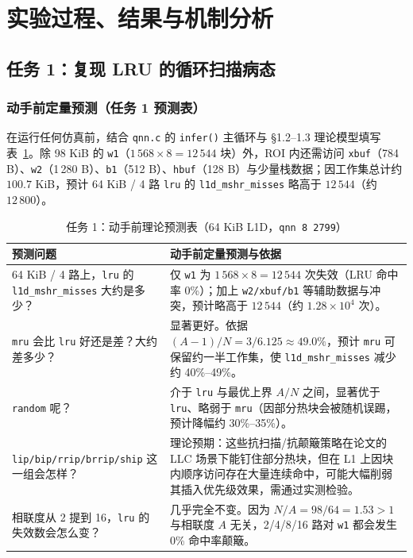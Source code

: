 \documentclass[12pt,a4paper,fontset=mac]{ctexart}
\begin{document}
\section{实验过程、结果与机制分析}

\subsection{任务 1：复现 LRU 的循环扫描病态}

\subsubsection{动手前定量预测（任务 1 预测表）}
在运行任何仿真前，结合 \texttt{qnn.c} 的 \texttt{infer()} 主循环与 §1.2--1.3 理论模型填写表~\ref{tab:t1_pred}。除 98 KiB 的 \texttt{w1}（$1\,568 \times 8 = 12\,544$ 块）外，ROI 内还需访问 \texttt{xbuf}（784 B）、\texttt{w2}（1\,280 B）、\texttt{b1}（512 B）、\texttt{hbuf}（128 B）与少量栈数据；因工作集总计约 $100.7$ KiB，预计 64 KiB / 4 路 \texttt{lru} 的 \texttt{l1d\_mshr\_misses} 略高于 $12\,544$（约 $12\,800$）。

\begin{table}[H]\centering\small
\caption{任务 1：动手前理论预测表（64 KiB L1D，\texttt{qnn 8 2799}）}\label{tab:t1_pred}
\begin{tabular}{p{6.8cm}p{7.4cm}}\toprule
预测问题 & 动手前定量预测与依据 \\\midrule
64 KiB / 4 路上，\texttt{lru} 的 \texttt{l1d\_mshr\_misses} 大约是多少？ & 仅 \texttt{w1} 为 $1\,568 \times 8 = 12\,544$ 次失效（LRU 命中率 0\%）；加上 \texttt{w2/xbuf/b1} 等辅助数据与冲突，预计略高于 $12\,544$（约 $1.28\times10^4$ 次）。 \\
\texttt{mru} 会比 \texttt{lru} 好还是差？大约差多少？ & 显著更好。依据 $(A-1)/N = 3/6.125 \approx 49.0\%$，预计 \texttt{mru} 可保留约一半工作集，使 \texttt{l1d\_mshr\_misses} 减少约 40\%--49\%。 \\
\texttt{random} 呢？ & 介于 \texttt{lru} 与最优上界 $A/N$ 之间，显著优于 \texttt{lru}、略弱于 \texttt{mru}（因部分热块会被随机误踢，预计降幅约 30\%--35\%）。 \\
\texttt{lip/bip/rrip/brrip/ship} 这一组会怎样？ & 理论预期：这些抗扫描/抗颠簸策略在论文的 LLC 场景下能钉住部分热块，但在 L1 上因块内顺序访问存在大量连续命中，可能大幅削弱其插入优先级效果，需通过实测检验。 \\
相联度从 2 提到 16，\texttt{lru} 的失效数会怎么变？ & 几乎完全不变。因为 $N/A = 98/64 = 1.53 > 1$ 与相联度 $A$ 无关，2/4/8/16 路对 \texttt{w1} 都会发生 0\% 命中率颠簸。 \\
\bottomrule\end{tabular}
\end{table}
\end{document}
